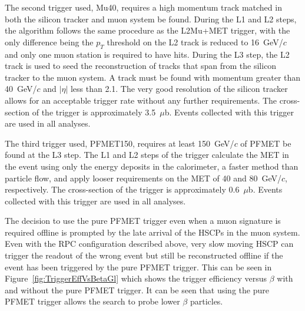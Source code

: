 The second trigger used, Mu40, requires a high momentum track matched in both the silicon tracker and muon system be found.
During the L1 and L2 steps, the algorithm follows the same procedure as the L2Mu+MET trigger, with the only difference being the $p_T$ threshold on the L2 track
is reduced to 16~GeV/$c$ and only one muon station is required to have hits.
During the L3 step, the L2 track is used to seed the reconstruction of tracks that span from the silicon tracker to the muon system.
A track must be found with momentum greater than 40~GeV/$c$ and $|\eta|$ less than 2.1. The very good resolution of the silicon tracker allows for an acceptable trigger rate
without any further requirements. 
The cross-section of the trigger is approximately 3.5~$\mu$b.
Events collected with this trigger are used in all analyses.

The third trigger used, PFMET150, requires at least 150~GeV/$c$ of PFMET be found at the L3 step. The L1 and L2 steps of the trigger calculate the MET in the event using
only the energy deposits in the calorimeter, a faster method than particle flow, and apply looser requirements on the MET of 40 and 80~GeV/$c$, respectively.
The cross-section of the trigger is approximately 0.6~$\mu$b.
Events collected with this trigger are used in all analyses.

The decision to use the pure PFMET trigger even when a muon signature is required offline is prompted by the late arrival of the HSCPs in the muon system.
Even with the RPC configuration described above, very slow moving HSCP can trigger the readout of the wrong event but still be reconstructed offline
if the event has been triggered by the pure PFMET trigger. This can be seen in Figure~\ref{fig:TriggerEffVsBetaGl} which shows the trigger efficiency versus $\beta$
with and without the pure PFMET trigger.
It can be seen that using the pure PFMET trigger allows the search to probe lower $\beta$ particles. 



